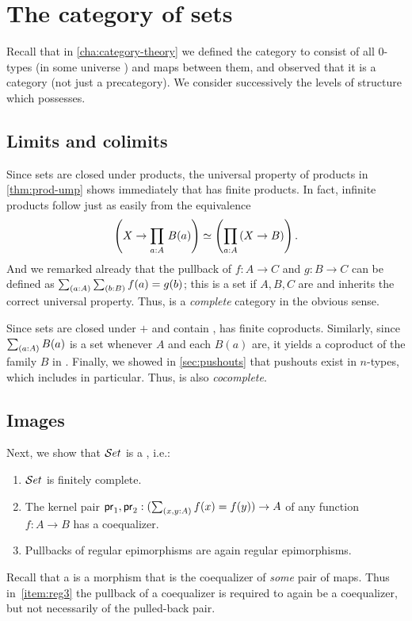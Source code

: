 \section{The category of sets}
\label{sec:piw-pretopos}

Recall that in \autoref{cha:category-theory} we defined the category \uset to consist of all $0$-types (in some universe \UU) and maps between them, and observed that it is a category (not just a precategory).
We consider successively the levels of structure which \uset possesses.

\subsection{Limits and colimits}
\label{subsec:limits-sets}

Since sets are closed under products, the universal property of products in \autoref{thm:prod-ump} shows immediately that \uset has finite products.
In fact, infinite products follow just as easily from the equivalence
\[ \left(X\to \prd{a:A} B(a) \right) \simeq \left(\prd{a:A} (X\to B)\right) .\]
And we remarked already that the pullback of $f:A\to C$ and $g:B\to C$ can be defined as $\sm{a:A}{b:B} f(a)=g(b)$; this is a set if $A,B,C$ are and inherits the correct universal property.
Thus, \uset is a \emph{complete} category in the obvious sense.

Since sets are closed under $+$ and contain \emptyt, \uset has finite coproducts.
Similarly, since $\sm{a:A}B(a)$ is a set whenever $A$ and each $B(a)$ are, it yields a coproduct of the family $B$ in \uset.
Finally, we showed in \autoref{sec:pushouts} that pushouts exist in $n$-types, which includes \uset in particular.
Thus, \uset is also \emph{cocomplete}.

\subsection{Images}
\label{sec:image}

Next, we show that $\mathcal{S}et$ is a , i.e.:
%
\begin{enumerate}
\item $\mathcal{S}et$ is finitely complete.\label{item:reg1}
\item The kernel pair $\proj1,\proj2: (\sm{x,y:A} f(x)= f(y)) \to A$ of any
      function $f : A \to B$ has a coequalizer.\label{item:reg2}
\item Pullbacks of regular epimorphisms are again regular epimorphisms.\label{item:reg3}
\end{enumerate}
%
Recall that a  is a morphism that is the coequalizer of \emph{some} pair of maps.
Thus in~\ref{item:reg3} the pullback of a coequalizer is required to again be a coequalizer, but not necessarily of the pulled-back pair.

